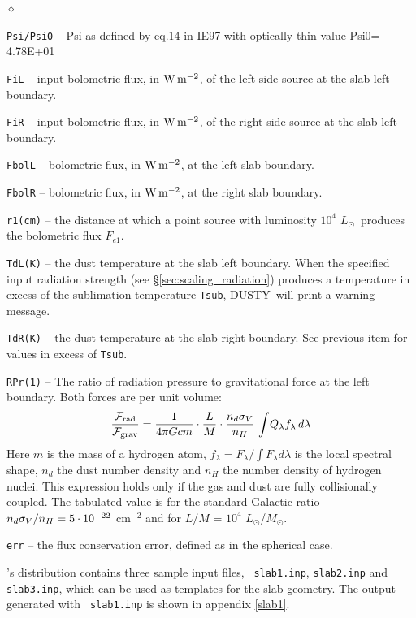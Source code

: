 \documentclass[11pt]{article}
\def\D    {{\sf DUSTY}}
\def\E#1{\hbox{$10^{#1}$}}
\def\eq#1{\begin{equation} #1 \end{equation}}
\def\Mo     {\hbox{$M_{\odot}$}}
\def\Lo     {\hbox{$L_{\odot}$}}
\def\sub#1{_{\rm #1}}
\def\Frad {\hbox{${\cal F}\sub{rad}$}}
\def\Fgrav{\hbox{${\cal F}\sub{grav}$}}
\begin{document}
\begin{list}{$\diamond$}{}
\item{\tt Psi/Psi0} -- Psi as defined by eq.14 in IE97 with optically
  thin value Psi0= 4.78E+01
\item{\tt FiL} -- input bolometric flux, in $\rm W\,m^{-2}$, of the
  left-side source at the slab left boundary.
\item{\tt FiR} -- input bolometric flux, in $\rm W\,m^{-2}$, of the
  right-side source at the slab left boundary.
\item{\tt FbolL} -- bolometric flux, in $\rm W\,m^{-2}$, at the left
  slab boundary.
\item{\tt FbolR} -- bolometric flux, in $\rm W\,m^{-2}$, at the right
  slab boundary.
\item{\tt r1(cm)} -- the distance at which a point source with
  luminosity \E4 \Lo\ produces the bolometric flux $F_{e1}$.
\item {\tt TdL(K)} -- the dust temperature at the slab left
  boundary. When the specified input radiation strength (see
  \S\ref{sec:scaling_radiation}) produces a temperature in excess of
  the sublimation temperature {\tt Tsub}, \D\ will print a warning message.
\item {\tt TdR(K)} -- the dust temperature at the slab right boundary.
  See previous item for values in excess of {\tt Tsub}.
\item {\tt RPr(1)} -- The ratio of radiation pressure to gravitational
  force at the left boundary. Both forces are per unit volume: \eq{
    {\Frad\over\Fgrav} = {1\over4\pi Gcm} \cdot{L\over M}
    \cdot{n_d\sigma_V\over n_H}\, \int\!Q_\lambda f_\lambda\,d\lambda
  } Here $m$ is the mass of a hydrogen atom, $f_\lambda =
  F_\lambda/\int F_\lambda d\lambda$ is the local spectral shape,
  $n_d$ the dust number density and $n_H$ the number density of
  hydrogen nuclei.  This expression holds only if the gas and dust are
  fully collisionally coupled. The tabulated value is for the standard
  Galactic ratio $n_d\sigma_V/n_H = 5\cdot\E{-22}$ cm$^{-2}$ and for
  $L/M$ = \E4 \Lo/\Mo.
\item{\tt err} -- the flux conservation error, defined as in the
  spherical case.

\end{list}

\bigskip \D's distribution contains three sample input files, {\tt
  slab1.inp}, {\tt slab2.inp} and {\tt slab3.inp}, which can be used
as templates for the slab geometry. The output generated with {\tt
  slab1.inp} is shown in appendix \ref{slab1}.
\end{document}
